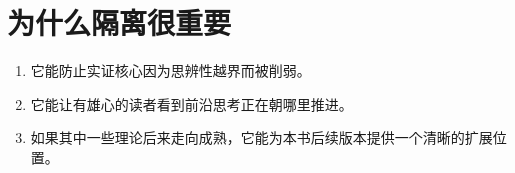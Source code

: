 \section{为什么隔离很重要}

\begin{enumerate}[nosep]
  \item 它能防止实证核心因为思辨性越界而被削弱。
  \item 它能让有雄心的读者看到前沿思考正在朝哪里推进。
  \item 如果其中一些理论后来走向成熟，它能为本书后续版本提供一个清晰的扩展位置。
\end{enumerate}